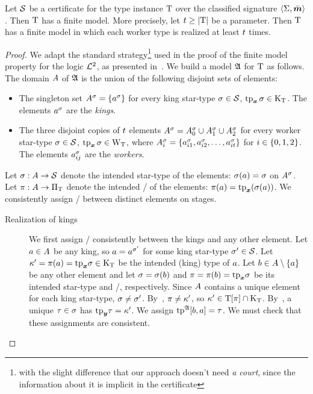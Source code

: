 \begin{theorem}\label{lem:cert-expand}
Let $\mathcal{S}$ be a certificate for the type instance $\mathrm{T}$ over the classified
signature $\left\langle \mathrm{\Sigma},\bar{\bm{m}} \right\rangle$.
Then $\mathrm{T}$ has a finite model.
More precisely, let $t \geq \left|\mathrm{T}\right|$ be a parameter.
Then $\mathrm{T}$ has a finite model in which each worker type is realized at least
$t$ times.
\end{theorem}
\begin{proof}
We adapt the standard strategy\footnote{with the slight difference that our
approach doesn't need \emph{a court}, since the information about it is implicit
in the certificate} used in the proof of the finite model property for the logic
$\mathcal{L}^{2}$, as presented in~\cite{gradel1999logics}.
We build a model $\mathfrak{A}$ for $\mathrm{T}$ as follows.
The domain $A$ of $\mathfrak{A}$ is the union of the following disjoint sets of
elements:
\begin{itemize}
  \item
  The singleton set $A^{\sigma} = \left\{a^{\sigma}\right\}$ for every king star-type
  $\sigma\in\mathcal{S}$, $\operatorname{tp}_{\bm{x}}\sigma \in {\mathrm{K}}_{\mathrm{T}}$.
  The elements $a^{\sigma}$ are the \emph{kings}.
  \item 
  The three disjoint copies of $t$ elements
  $A^{\sigma} = A^{\sigma}_{0} \cup A^{\sigma}_{1} \cup A^{\sigma}_{2}$ for every
  worker star-type $\sigma \in \mathcal{S}$, $\operatorname{tp}_{\bm{x}}\sigma \in {\mathrm{W}}_{\mathrm{T}}$,
  where $A^{\sigma}_{i} = \left\{a^{\sigma}_{i 1}, a^{\sigma}_{i 2}, \dots,
  a^{\sigma}_{i t}\right\}$ for $i \in \left\{0,1,2\right\}$.
  The elements $a^{\sigma}_{i j}$ are the \emph{workers}.
\end{itemize}
Let $\sigma : A \to \mathcal{S}$ denote the intended star-type of the elements:
$\sigma(a) = \sigma$ on $A^{\sigma}$.
Let $\pi : A \to {\Pi}_{\mathrm{T}}$ denote the intended \onetype/ of the elements:
$\pi(a) = \mathrm{tp}_{\bm{x}}(\sigma(a))$.
We consistently assign \twotypes/ between distinct elements on stages.
\begin{description}
  \item[Realization of kings]
  We first assign \twotypes/ consistently between the kings and any other
  element.
  Let $a\in A$ be any king,
  so $a = a^{{\sigma'}}$ for some king star-type ${\sigma'}\in\mathcal{S}$.
  Let ${\kappa'} = \pi(a) = \mathrm{tp}_{\bm{x}}\sigma \in {\mathrm{K}}_{\mathrm{T}}$
  be the intended (king) type of $a$.
  Let $b \in A \setminus \left\{a\right\}$ be any other element and let
  $\sigma = \sigma(b)$ and $\pi = \pi(b) = \mathrm{tp}_{\bm{x}}\sigma$ be its intended
  star-type and \onetype/, respectively.
  Since $A$ contains a unique element for each king star-type,
  $\sigma\neq{\sigma'}$.
  By~, $\pi \neq {\kappa'}$,
  so ${\kappa'} \in \mathrm{T}[\pi] \cap {\mathrm{K}}_{\mathrm{T}}$.
  By~, a unique $\tau\in\sigma$ has $\mathrm{tp}_{\bm{y}}\tau = {\kappa'}$.
  We assign $\operatorname{tp}^{\mathfrak{A}}[b,a] = \tau$.
  We must check that these assignments are consistent.
  

\end{description}
\end{proof}
